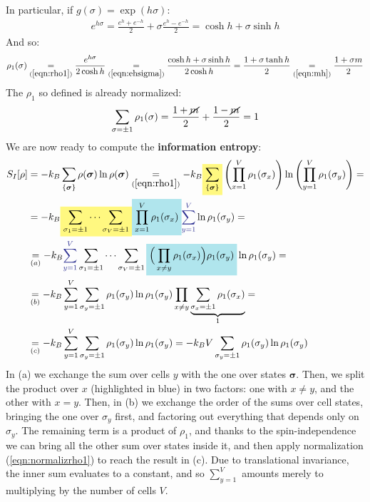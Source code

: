 \documentclass[../template.tex]{subfiles}
\begin{document}
\begin{example}
    In particular, if $g(\sigma) = \exp(h \sigma)$:
    \begin{align}\label{eqn:ehsigma}
        e^{h \sigma} = \frac{e^h + e^{-h}}{2} + \sigma \frac{e^h - e^{-h}}{2} = \cosh h + \sigma \sinh h  
    \end{align}
    And so:
    \begin{align}\label{eqn:rho1-m}
        \rho_1(\sigma) \underset{(\ref{eqn:rho1})}{=}  \frac{e^{h \sigma}}{2 \cosh h} \underset{(\ref{eqn:ehsigma})}{=} \frac{\cosh h + \sigma \sinh h}{2 \cosh h} = \frac{1+\sigma \tanh h}{2} \underset{(\ref{eqn:mh})}{=}  \frac{1 + \sigma m}{2} 
    \end{align}
    The $\rho_1$ so defined is already normalized:
    \begin{align} \label{eqn:normalizrho1}
        \sum_{\sigma = \pm 1} \rho_1(\sigma) = \frac{1+\cancel{m}}{2} + \frac{1-\cancel{m}}{2} =   1
    \end{align}
    We are now ready to compute the \textbf{information entropy}:
    \begin{align}\nonumber
        S_I[\rho] &= -k_B \sum_{\{\bm{\sigma}\}} \rho(\bm{\sigma}) \ln \rho(\bm{\sigma}) \underset{(\ref{eqn:rho1})}{=}  -k_B \hlc{Yellow}{\sum_{\{\bm{\sigma}\}}} \left(\prod_{x=1}^V \rho_1(\sigma_x)\right) \ln \left(\prod_{y=1}^V \rho_1(\sigma_y)\right) =\\ \nonumber
        &=-k_B \hlc{Yellow}{\sum_{\sigma_1 = \pm 1} \cdots \sum_{\sigma_V = \pm 1}} \hlc{SkyBlue}{\prod_{x=1}^V \rho_1(\sigma_x)} \textcolor{Blue}{\sum_{y=1}^V} \ln \rho_1(\sigma_y) =\\ \nonumber
        &\underset{(a)}{=}  -k_B \textcolor{Blue}{\sum_{y=1}^V} \sum_{\sigma_1 = \pm 1} \cdots \sum_{\sigma_V = \pm 1} \hlc{SkyBlue}{\Big(\prod_{x \neq y} \rho_1(\sigma_x)\Big) \rho_1(\sigma_y)} \ln \rho_1 (\sigma_y) =\\\nonumber
        &\underset{(b)}{=}  -k_B \sum_{y=1}^{V} \sum_{\sigma_y = \pm 1} \rho_1(\sigma_y) \ln \rho_1(\sigma_y) \prod_{x \neq y} \underbrace{\sum_{\sigma_{x} = \pm 1} \rho_1(\sigma_x)}_{1} =\\
        &\underset{(c)}{=}  -k_B \sum_{y=1}^V \sum_{\sigma_y = \pm 1} \rho_1(\sigma_y) \ln \rho_1(\sigma_y) = -k_B V \sum_{\sigma_y = \pm 1} \rho_1(\sigma_y) \ln \rho_1(\sigma_y) \label{eqn:lstep}
    \end{align}
    In (a) we exchange the sum over cells $y$ with the one over states $\bm{\sigma}$. Then, we split the product over $x$ (highlighted in blue) in two factors: one with $x \neq y$, and the other with $x=y$. Then, in (b) we exchange the order of the sums over cell states, bringing the one over $\sigma_y$ first, and factoring out everything that depends only on $\sigma_y$. The remaining term is a product of $\rho_1$, and thanks to the spin-independence we can bring all the other sum over states inside it, and then apply normalization (\ref{eqn:normalizrho1}) to reach the result in (c). Due to translational invariance, the inner sum evaluates to a constant, and so $\sum_{y=1}^V$ amounts merely to multiplying by the number of cells $V$.


\end{example}
\end{document}
